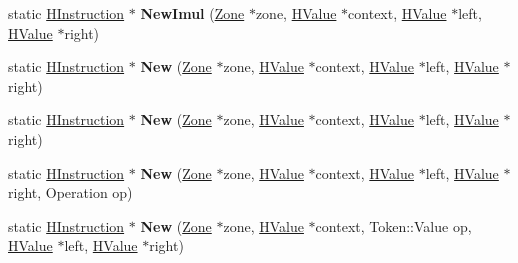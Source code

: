 \begin{DoxyCompactItemize}
\item 
\hypertarget{classv8_1_1internal_1_1_v8___f_i_n_a_l_afd0c274081c9f30f1ecc5cd9c1ceb5c8}{}static \hyperlink{classv8_1_1internal_1_1_h_instruction}{H\+Instruction} $\ast$ {\bfseries New\+Imul} (\hyperlink{classv8_1_1internal_1_1_zone}{Zone} $\ast$zone, \hyperlink{classv8_1_1internal_1_1_h_value}{H\+Value} $\ast$context, \hyperlink{classv8_1_1internal_1_1_h_value}{H\+Value} $\ast$left, \hyperlink{classv8_1_1internal_1_1_h_value}{H\+Value} $\ast$right)\label{classv8_1_1internal_1_1_v8___f_i_n_a_l_afd0c274081c9f30f1ecc5cd9c1ceb5c8}

\item 
\hypertarget{classv8_1_1internal_1_1_v8___f_i_n_a_l_ae2081c07c94daaf9b4f002f76d618c00}{}static \hyperlink{classv8_1_1internal_1_1_h_instruction}{H\+Instruction} $\ast$ {\bfseries New} (\hyperlink{classv8_1_1internal_1_1_zone}{Zone} $\ast$zone, \hyperlink{classv8_1_1internal_1_1_h_value}{H\+Value} $\ast$context, \hyperlink{classv8_1_1internal_1_1_h_value}{H\+Value} $\ast$left, \hyperlink{classv8_1_1internal_1_1_h_value}{H\+Value} $\ast$right)\label{classv8_1_1internal_1_1_v8___f_i_n_a_l_ae2081c07c94daaf9b4f002f76d618c00}

\item 
\hypertarget{classv8_1_1internal_1_1_v8___f_i_n_a_l_ae2081c07c94daaf9b4f002f76d618c00}{}static \hyperlink{classv8_1_1internal_1_1_h_instruction}{H\+Instruction} $\ast$ {\bfseries New} (\hyperlink{classv8_1_1internal_1_1_zone}{Zone} $\ast$zone, \hyperlink{classv8_1_1internal_1_1_h_value}{H\+Value} $\ast$context, \hyperlink{classv8_1_1internal_1_1_h_value}{H\+Value} $\ast$left, \hyperlink{classv8_1_1internal_1_1_h_value}{H\+Value} $\ast$right)\label{classv8_1_1internal_1_1_v8___f_i_n_a_l_ae2081c07c94daaf9b4f002f76d618c00}

\item 
\hypertarget{classv8_1_1internal_1_1_v8___f_i_n_a_l_acbdb3bbe10de2340af964f09f58c421d}{}static \hyperlink{classv8_1_1internal_1_1_h_instruction}{H\+Instruction} $\ast$ {\bfseries New} (\hyperlink{classv8_1_1internal_1_1_zone}{Zone} $\ast$zone, \hyperlink{classv8_1_1internal_1_1_h_value}{H\+Value} $\ast$context, \hyperlink{classv8_1_1internal_1_1_h_value}{H\+Value} $\ast$left, \hyperlink{classv8_1_1internal_1_1_h_value}{H\+Value} $\ast$right, Operation op)\label{classv8_1_1internal_1_1_v8___f_i_n_a_l_acbdb3bbe10de2340af964f09f58c421d}

\item 
\hypertarget{classv8_1_1internal_1_1_v8___f_i_n_a_l_a278bc5b131b4221bf361fd953a1dce15}{}static \hyperlink{classv8_1_1internal_1_1_h_instruction}{H\+Instruction} $\ast$ {\bfseries New} (\hyperlink{classv8_1_1internal_1_1_zone}{Zone} $\ast$zone, \hyperlink{classv8_1_1internal_1_1_h_value}{H\+Value} $\ast$context, Token\+::\+Value op, \hyperlink{classv8_1_1internal_1_1_h_value}{H\+Value} $\ast$left, \hyperlink{classv8_1_1internal_1_1_h_value}{H\+Value} $\ast$right)\label{classv8_1_1internal_1_1_v8___f_i_n_a_l_a278bc5b131b4221bf361fd953a1dce15}


\end{DoxyCompactItemize}
